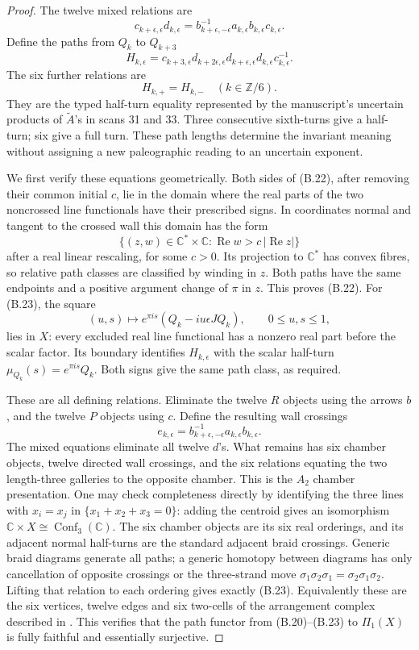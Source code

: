 \begin{proof}
The twelve mixed relations are
\[
 c_{k+\epsilon,\epsilon}d_{k,\epsilon}
 =b_{k+\epsilon,-\epsilon}^{-1}a_{k,\epsilon}
       b_{k,\epsilon}c_{k,\epsilon}.                 \tag{B.22}
\]
Define the paths from $Q_k$ to $Q_{k+3}$
\[
 H_{k,\epsilon}=
 c_{k+3,\epsilon}
 d_{k+2\epsilon,\epsilon}d_{k+\epsilon,\epsilon}d_{k,\epsilon}
 c_{k,\epsilon}^{-1}.
\]
The six further relations are
\[
 H_{k,+}=H_{k,-}\quad(k\in\mathbb Z/6).             \tag{B.23}
\]
They are the typed half-turn equality represented by the
manuscript's uncertain products of $\widetilde A$'s in scans
31 and 33.  Three consecutive sixth-turns give a half-turn;
six give a full turn.  These path lengths determine the invariant
meaning without assigning a new paleographic reading to an
uncertain exponent.

We first verify these equations geometrically.  Both sides of
(B.22), after removing their common initial $c$, lie in the domain
where the real parts of the two noncrossed line functionals have
their prescribed signs.  In coordinates normal and tangent to
the crossed wall this domain has the form
\[
 \{(z,w)\in\mathbb C^*\times\mathbb C:
          \operatorname{Re}w>c\,|\operatorname{Re}z|\}
\]
after a real linear rescaling, for some $c>0$.  Its projection to
$\mathbb C^*$ has convex fibres, so relative path classes are
classified by winding in $z$.  Both paths have the same endpoints
and a positive argument change of $\pi$ in $z$.  This proves
(B.22).  For (B.23), the square
\[
 (u,s)\longmapsto e^{\pi i s}(Q_k-iu\epsilon JQ_k),
 \qquad 0\leq u,s\leq1,
\]
lies in $X$: every excluded real line functional has a nonzero
real part before the scalar factor.  Its boundary identifies
$H_{k,\epsilon}$ with the scalar half-turn
$\mu_{Q_k}(s)=e^{\pi i s}Q_k$.  Both signs give the same path
class, as required.

These are all defining relations.  Eliminate the twelve $R$
objects using the arrows $b$, and the twelve $P$ objects using
$c$.  Define the resulting wall crossings
\[
 e_{k,\epsilon}
   =b_{k+\epsilon,-\epsilon}^{-1}a_{k,\epsilon}b_{k,\epsilon}.
\]
The mixed equations eliminate all twelve $d$'s.  What remains has
six chamber objects, twelve directed wall crossings, and the six
relations equating the two length-three galleries to the
opposite chamber.  This is the $A_2$ chamber presentation.  One
may check completeness directly by identifying the three lines
with $x_i=x_j$ in $\{x_1+x_2+x_3=0\}$: adding the centroid gives
an isomorphism $\mathbb C\times X\cong\operatorname{Conf}_3
(\mathbb C)$.  The six chamber objects are its six real orderings,
and its adjacent normal half-turns are the standard adjacent
braid crossings.  Generic braid diagrams generate all paths;
a generic homotopy between diagrams has only cancellation of
opposite crossings or the three-strand move
$\sigma_1\sigma_2\sigma_1=\sigma_2\sigma_1\sigma_2$.
Lifting that relation to each ordering gives exactly (B.23).
Equivalently these are the six vertices, twelve edges and six
two-cells of the arrangement complex described in
\citet[Section 4.1]{B_SalvettiSettepanella}.  This verifies that
the path functor from (B.20)--(B.23) to $\Pi_1(X)$ is fully
faithful and essentially surjective.


\end{proof}
